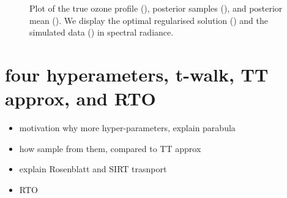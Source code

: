 \begin{figure}[h]
	\centering
	\renewcommand\sffamily{}
	\renewcommand{\mathbf}{\bm}
	
	\caption{Plot of the true ozone profile (), posterior samples (), and posterior mean (). We display the optimal regularised solution () and the simulated data () in spectral radiance.}
	\label{fig:Results}
\end{figure}



\section{four hyperameters, t-walk, TT approx, and RTO}

\begin{itemize}
	\item motivation why more hyper-parameters, explain parabula
	\item how sample from them, compared to TT approx
	\item explain Rosenblatt and SIRT trasnport
	\item RTO
\end{itemize}


